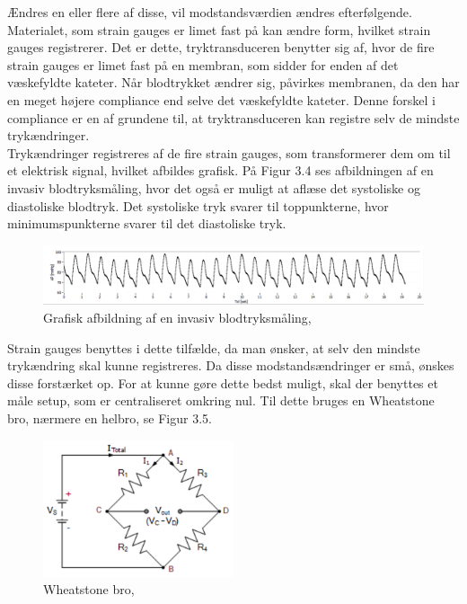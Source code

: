 Ændres en eller flere af disse, vil modstandsværdien ændres efterfølgende. Materialet, som strain gauges er limet fast på kan ændre form, hvilket strain gauges registrerer. Det er dette, tryktransduceren benytter sig af, hvor de fire strain gauges er limet fast på en membran, som sidder for enden af det væskefyldte kateter. Når blodtrykket ændrer sig, påvirkes membranen, da den har en meget højere compliance end selve det væskefyldte kateter. Denne forskel i compliance er en af grundene til, at tryktransduceren kan registre selv de mindste trykændringer. \\ 
Trykændringer registreres af de fire strain gauges, som transformerer dem om til et elektrisk signal, hvilket afbildes grafisk. På Figur 3.4 ses afbildningen af en invasiv blodtryksmåling, hvor det også er muligt at aflæse det systoliske og diastoliske blodtryk. Det systoliske tryk svarer til toppunkterne, hvor minimumspunkterne svarer til det diastoliske tryk.


\begin{figure}[H]
	\centering
	\includegraphics[width=1\textwidth]{Figurer/Snip20151213_84}
	\caption{Grafisk afbildning af en invasiv blodtryksmåling, \protect\cite[s. 34]{Hjertecyklus}}
\end{figure}

Strain gauges benyttes i dette tilfælde, da man ønsker, at selv den mindste trykændring skal kunne registreres. Da disse modstandsændringer er små, ønskes disse forstærket op. For at kunne gøre dette bedst muligt, skal der benyttes et måle setup, som er centraliseret omkring nul. Til dette bruges en Wheatstone bro, nærmere en helbro, se Figur 3.5. 

\begin{figure}[H]
	\centering
	\includegraphics[width=0.5\textwidth]{Figurer/Snip20151207_63}
	\caption{Wheatstone bro, \protect\cite{Wheatestone}}
\end{figure}

